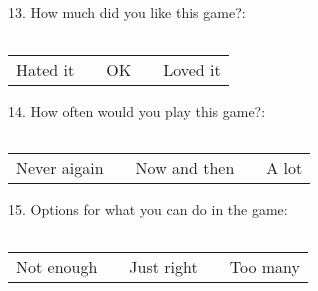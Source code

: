 13. How much did you like this game?:
\begin{center}
 	\begin{tabular}{| p{1cm} | p{1cm} | p{1cm} | p{1cm} | p{1cm} |}
    	\hline
     	&  &  &  &  \\ \hline
  	\end{tabular}
\end{center}
\begin{center}
	\begin{tabular}{ >{\centering\arraybackslash}p{1cm}  >{\centering\arraybackslash}p{1cm}  >{\centering\arraybackslash}p{1cm}  >{\centering\arraybackslash}p{1cm}  >{\centering\arraybackslash}p{1cm} }
    Hated it &  & OK &  & Loved it \\ 
 	\end{tabular}
\end{center}

14. How often would you play this game?:
\begin{center}
 	\begin{tabular}{| p{1cm} | p{1cm} | p{1cm} | p{1cm} | p{1cm} |}
    	\hline
     	&  &  &  &  \\ \hline
  	\end{tabular}
\end{center}
\begin{center}
	\begin{tabular}{ >{\centering\arraybackslash}p{1cm}  >{\centering\arraybackslash}p{1cm}  >{\centering\arraybackslash}p{1cm}  >{\centering\arraybackslash}p{1cm}  >{\centering\arraybackslash}p{1cm} }
    Never aigain &  & Now and then &  & A lot \\ 
 	\end{tabular}
\end{center}

15. Options for what you can do in the game:
\begin{center}
 	\begin{tabular}{| p{1cm} | p{1cm} | p{1cm} | p{1cm} | p{1cm} |}
    	\hline
     	&  &  &  &  \\ \hline
  	\end{tabular}
\end{center}
\begin{center}
	\begin{tabular}{ >{\centering\arraybackslash}p{1cm}  >{\centering\arraybackslash}p{1cm}  >{\centering\arraybackslash}p{1cm}  >{\centering\arraybackslash}p{1cm}  >{\centering\arraybackslash}p{1cm} }
    Not enough &  & Just right &  & Too many \\ 
 	\end{tabular}
\end{center}

